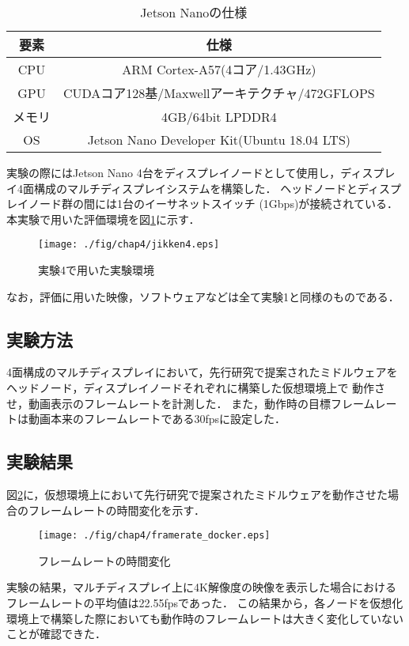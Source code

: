 \begin{table}[H]
    \caption{Jetson Nanoの仕様}
    \begin{center}
    \begin{tabular}{cc}
    \hline
    要素 & 仕様 \\\hline\hline
    CPU & ARM Cortex-A57(4コア/1.43GHz) \\ \hline
    GPU & CUDAコア128基/Maxwellアーキテクチャ/472GFLOPS \\ \hline
    メモリ & 4GB/64bit LPDDR4 \\ \hline
    OS & Jetson Nano Developer Kit(Ubuntu 18.04 LTS)\\ \hline
    \end{tabular}
    \label{jetson_spec}
    \end{center}
\end{table}

実験の際にはJetson Nano 4台をディスプレイノードとして使用し，ディスプレイ4面構成のマルチディスプレイシステムを構築した．
ヘッドノードとディスプレイノード群の間には1台のイーサネットスイッチ (1Gbps)が接続されている．
本実験で用いた評価環境を図\ref{jikken4_environment}に示す．

\begin{figure}[H]
    \hspace*{\fill}
    \texttt{[image: ./fig/chap4/jikken4.eps]}
    \hspace*{\fill}
    \caption{実験4で用いた実験環境}
    \label{jikken4_environment}
\end{figure}

なお，評価に用いた映像，ソフトウェアなどは全て実験1と同様のものである．

\subsection*{実験方法}
4面構成のマルチディスプレイにおいて，先行研究で提案されたミドルウェアをヘッドノード，ディスプレイノードそれぞれに構築した仮想環境上で
動作させ，動画表示のフレームレートを計測した．
また，動作時の目標フレームレートは動画本来のフレームレートである30fpsに設定した．

\subsection*{実験結果}
図\ref{framerate}に，仮想環境上において先行研究で提案されたミドルウェアを動作させた場合のフレームレートの時間変化を示す．

\begin{figure}[H]
    \hspace*{\fill}
    \texttt{[image: ./fig/chap4/framerate\_docker.eps]}
    \hspace*{\fill}
    \caption{フレームレートの時間変化}
    \label{framerate}
\end{figure}

実験の結果，マルチディスプレイ上に4K解像度の映像を表示した場合におけるフレームレートの平均値は22.55fpsであった．
この結果から，各ノードを仮想化環境上で構築した際においても動作時のフレームレートは大きく変化していないことが確認できた．